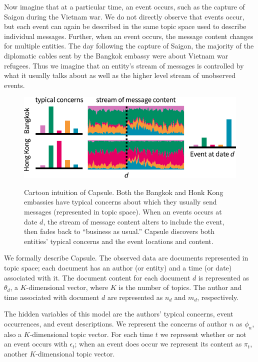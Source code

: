 Now imagine that at a particular time, an event occurs, such as the capture of Saigon during the Vietnam war.  We do not directly observe that events occur, but each event can again be described in the same topic space used to describe individual messages.  Further, when an event occurs, the message content changes for multiple entities. The day following the capture of Saigon, the majority of the diplomatic cables sent by the Bangkok embassy were about Vietnam war refugees.
Thus we imagine that an entity's stream of messages is controlled by what it usually talks about as well as the higher level stream of unobserved events.


\begin{figure}
\centering
\includegraphics[width=\linewidth]{fig/cartoon.pdf}
\label{fig:cartoon}
\vskip -12pt
\caption{Cartoon intuition of Capsule.  Both the Bangkok and Honk Kong embassies have typical concerns about which they usually send messages (represented in topic space).  When an events occurs at date $d$, the stream of message content alters to include the event, then fades back to ``business as usual.''  Capsule discovers both entities' typical concerns and the event locations and content.}
\end{figure}


We formally describe Capsule. The observed data are documents represented in topic space; each document has an author (or entity) and a time (or date) associated with it.  The document content for each document $d$ is represented as $\theta_d$, a $K$-dimensional vector, where $K$ is the number of topics.  The author and time associated with document $d$ are represented as $n_d$ and $m_d$, respectively.

The hidden variables of this model are the authors' typical concerns, event occurrences, and event descriptions.  We represent the concerns of author $n$ as $\phi_n$, also a $K$-dimensional topic vector.  For each time $t$ we represent whether or not an event occurs with $\epsilon_t$; when an event does occur we represent its content as $\pi_t$, another $K$-dimensional topic vector.

